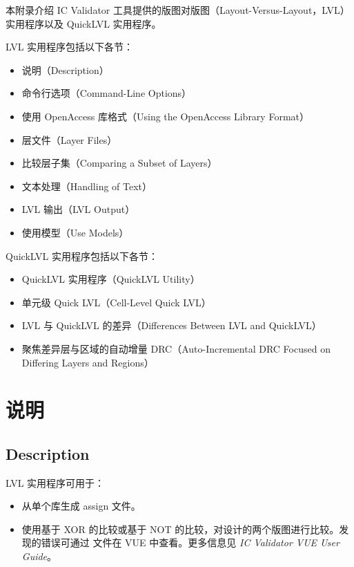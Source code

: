 \label{app:b}

本附录介绍 IC Validator 工具提供的版图对版图（Layout-Versus-Layout，LVL）实用程序以及 QuickLVL 实用程序。

LVL 实用程序包括以下各节：
\begin{itemize}
  \item 说明（Description）
  \item 命令行选项（Command-Line Options）
  \item 使用 OpenAccess 库格式（Using the OpenAccess Library Format）
  \item 层文件（Layer Files）
  \item 比较层子集（Comparing a Subset of Layers）
  \item 文本处理（Handling of Text）
  \item LVL 输出（LVL Output）
  \item 使用模型（Use Models）
\end{itemize}

QuickLVL 实用程序包括以下各节：
\begin{itemize}
  \item QuickLVL 实用程序（QuickLVL Utility）
  \item 单元级 Quick LVL（Cell-Level Quick LVL）
  \item LVL 与 QuickLVL 的差异（Differences Between LVL and QuickLVL）
  \item 聚焦差异层与区域的自动增量 DRC（Auto-Incremental DRC Focused on Differing Layers and Regions）
\end{itemize}

\section{说明}
\subsection*{Description}

LVL 实用程序可用于：
\begin{itemize}
  \item 从单个库生成 assign 文件。
  \item 使用基于 XOR 的比较或基于 NOT 的比较，对设计的两个版图进行比较。发现的错误可通过  文件在 VUE 中查看。更多信息见 \textit{IC Validator VUE User Guide}。
\end{itemize}

